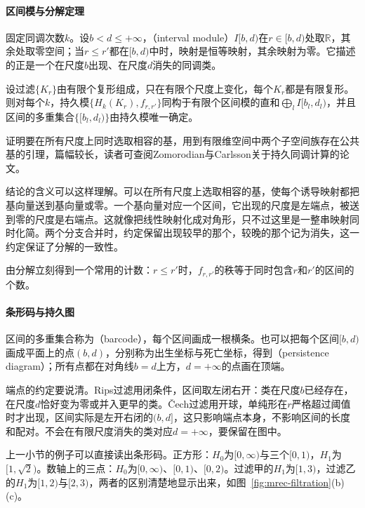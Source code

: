 \paragraph{区间模与分解定理}

固定同调次数$k$。设$b<d\leq+\infty$，（interval module）$I[b,d)$在$r\in[b,d)$处取$\mathbb R$，其余处取零空间；当$r\leq r'$都在$[b,d)$中时，映射是恒等映射，其余映射为零。它描述的正是一个在尺度$b$出现、在尺度$d$消失的同调类。

\begin{theorem}[区间分解]
\label{thm:mrec-interval-decomposition}
设过滤$\{K_r\}$由有限个复形组成，只在有限个尺度上变化，每个$K_r$都是有限复形。则对每个$k$，持久模$\{H_k(K_r),f_{r,r'}\}$同构于有限个区间模的直和$\bigoplus_lI[b_l,d_l)$，并且区间的多重集合$\{[b_l,d_l)\}$由持久模唯一确定。
\end{theorem}

证明要在所有尺度上同时选取相容的基，用到有限维空间中两个子空间族存在公共基的引理，篇幅较长，读者可查阅Zomorodian与Carlsson关于持久同调计算的论文。

结论的含义可以这样理解。可以在所有尺度上选取相容的基，使每个诱导映射都把基向量送到基向量或零。一个基向量对应一个区间，它出现的尺度是左端点，被送到零的尺度是右端点。这就像把线性映射化成对角形，只不过这里是一整串映射同时化简。两个分支合并时，约定保留出现较早的那个，较晚的那个记为消失，这一约定保证了分解的一致性。

由分解立刻得到一个常用的计数：$r\leq r'$时，$f_{r,r'}$的秩等于同时包含$r$和$r'$的区间的个数。

\paragraph{条形码与持久图}

区间的多重集合称为（barcode），每个区间画成一根横条。也可以把每个区间$[b,d)$画成平面上的点$(b,d)$，分别称为出生坐标与死亡坐标，得到（persistence diagram）；所有点都在对角线$b=d$上方，$d=+\infty$的点画在顶端。

端点的约定要说清。Rips过滤用闭条件，区间取左闭右开：类在尺度$b$已经存在，在尺度$d$恰好变为零或并入更早的类。Čech过滤用开球，单纯形在$r$严格超过阈值时才出现，区间实际是左开右闭的$(b,d]$，这只影响端点本身，不影响区间的长度和配对。不会在有限尺度消失的类对应$d=+\infty$，要保留在图中。

上一小节的例子可以直接读出条形码。正方形：$H_0$为$[0,\infty)$与三个$[0,1)$，$H_1$为$[1,\sqrt2)$。数轴上的三点：$H_0$为$[0,\infty)$、$[0,1)$、$[0,2)$。过滤甲的$H_1$为$[1,3)$，过滤乙的$H_1$为$[1,2)$与$[2,3)$，两者的区别清楚地显示出来，如图~\ref{fig:mrec-filtration}(b)(c)。

